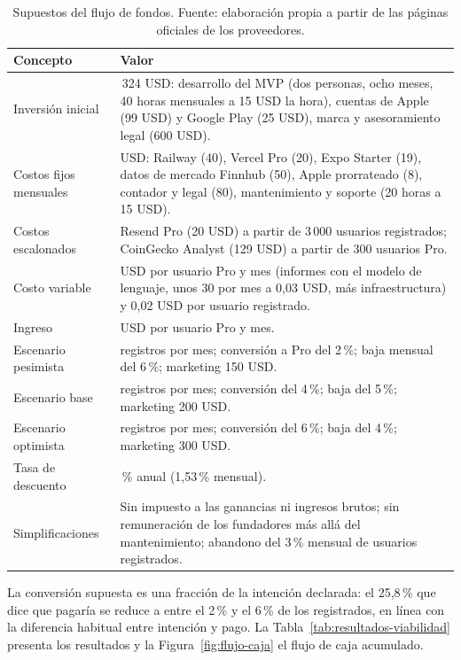 \begin{table}[ht]
\centering\small\renewcommand{\arraystretch}{1.15}
\caption{Supuestos del flujo de fondos. Fuente: elaboración propia a partir de las páginas oficiales de los proveedores.}\label{tab:supuestos}
\begin{tabular}{>{\raggedright\arraybackslash}p{6.4cm}>{\raggedright\arraybackslash}p{7.2cm}}\hline
\textbf{Concepto} & \textbf{Valor}\\\hline
Inversión inicial & 10\,324 USD: desarrollo del MVP (dos personas, ocho meses, 40 horas mensuales a 15 USD la hora), cuentas de Apple (99 USD) y Google Play (25 USD), marca y asesoramiento legal (600 USD).\\
Costos fijos mensuales & 517 USD: Railway (40), Vercel Pro (20), Expo Starter (19), datos de mercado Finnhub (50), Apple prorrateado (8), contador y legal (80), mantenimiento y soporte (20 horas a 15 USD).\\
Costos escalonados & Resend Pro (20 USD) a partir de 3\,000 usuarios registrados; CoinGecko Analyst (129 USD) a partir de 300 usuarios Pro.\\
Costo variable & 1 USD por usuario Pro y mes (informes con el modelo de lenguaje, unos 30 por mes a 0,03 USD, más infraestructura) y 0,02 USD por usuario registrado.\\
Ingreso & 6 USD por usuario Pro y mes.\\
Escenario pesimista & 150 registros por mes; conversión a Pro del 2\,\%; baja mensual del 6\,\%; marketing 150 USD.\\
Escenario base & 300 registros por mes; conversión del 4\,\%; baja del 5\,\%; marketing 200 USD.\\
Escenario optimista & 600 registros por mes; conversión del 6\,\%; baja del 4\,\%; marketing 300 USD.\\
Tasa de descuento & 20\,\% anual (1,53\,\% mensual).\\
Simplificaciones & Sin impuesto a las ganancias ni ingresos brutos; sin remuneración de los fundadores más allá del mantenimiento; abandono del 3\,\% mensual de usuarios registrados.\\\hline
\end{tabular}
\end{table}

La conversión supuesta es una fracción de la intención declarada: el 25,8\,\% que dice que pagaría se reduce a entre el 2\,\% y el 6\,\% de los registrados, en línea con la diferencia habitual entre intención y pago. La Tabla~\ref{tab:resultados-viabilidad} presenta los resultados y la Figura~\ref{fig:flujo-caja} el flujo de caja acumulado.

